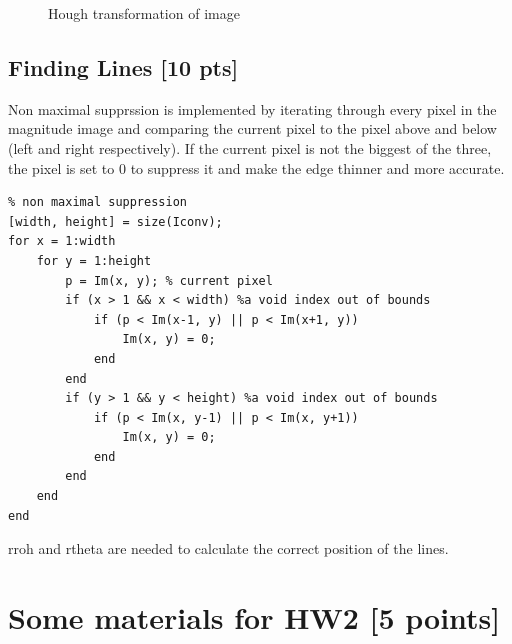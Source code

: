 \documentclass[12pt,a4paper]{article}
\begin{document}
\begin{figure}[!h]
\begin{center}
        \caption{Hough transformation of image}
        \label{fig:hough}
    \end{center}
\end{figure}



\subsection{Finding Lines [10 pts]}
Non maximal supprssion is implemented by iterating through every pixel in the magnitude image and comparing the current pixel to the pixel above and below (left and right respectively). If the current pixel is not the biggest of the three, the pixel is set to 0 to suppress it and make the edge thinner and more accurate.

\begin{lstlisting}
% non maximal suppression
[width, height] = size(Iconv);
for x = 1:width
    for y = 1:height
        p = Im(x, y); % current pixel
        if (x > 1 && x < width) %a void index out of bounds
            if (p < Im(x-1, y) || p < Im(x+1, y))
                Im(x, y) = 0;
            end
        end
        if (y > 1 && y < height) %a void index out of bounds
            if (p < Im(x, y-1) || p < Im(x, y+1))
                Im(x, y) = 0;
            end
        end
    end
end
\end{lstlisting}

rroh and rtheta are needed to calculate the correct position of the lines.


\section{Some materials for HW2 [5 points]}



\end{document}
